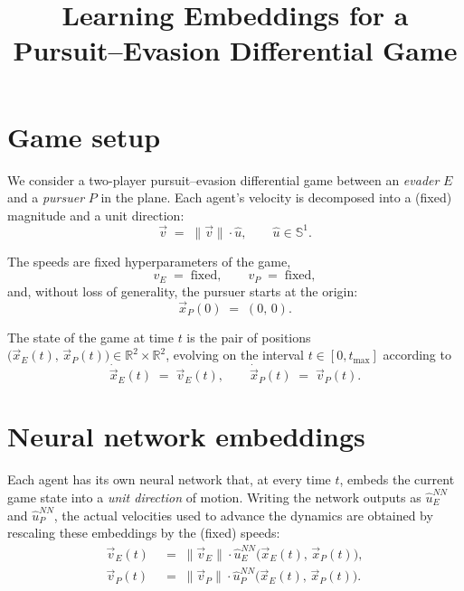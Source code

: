 \documentclass[11pt]{article}
\title{Learning Embeddings for a Pursuit--Evasion Differential Game}
\author{}
\date{}
\begin{document}
\maketitle

\section{Game setup}

We consider a two-player pursuit--evasion differential game between an
\emph{evader} $E$ and a \emph{pursuer} $P$ in the plane.
Each agent's velocity is decomposed into a (fixed) magnitude and a unit
direction:
\begin{equation}
  \vec{v} \;=\; \|\vec{v}\| \cdot \hat{u},
  \qquad \hat{u} \in \mathbb{S}^{1}.
\end{equation}

The speeds are fixed hyperparameters of the game,
\begin{equation}
  v_E \;=\; \text{fixed}, \qquad v_P \;=\; \text{fixed},
\end{equation}
and, without loss of generality, the pursuer starts at the origin:
\begin{equation}
  \vec{x}_P(0) \;=\; (0,\,0).
\end{equation}

The state of the game at time $t$ is the pair of positions
$\bigl(\vec{x}_E(t),\,\vec{x}_P(t)\bigr) \in \mathbb{R}^2 \times \mathbb{R}^2$,
evolving on the interval $t \in [0, t_{\max}]$ according to
\begin{equation}
  \dot{\vec{x}}_E(t) \;=\; \vec{v}_E(t), \qquad
  \dot{\vec{x}}_P(t) \;=\; \vec{v}_P(t).
\end{equation}

\section{Neural network embeddings}

Each agent has its own neural network that, at every time $t$, embeds the
current game state into a \emph{unit direction} of motion.  Writing the
network outputs as $\hat{u}_E^{NN}$ and $\hat{u}_P^{NN}$, the actual
velocities used to advance the dynamics are obtained by rescaling these
embeddings by the (fixed) speeds:
\begin{align}
  \vec{v}_E(t) &\;=\; \|\vec{v}_E\| \cdot \hat{u}_E^{NN}\!\bigl(\vec{x}_E(t),\,\vec{x}_P(t)\bigr), \\
  \vec{v}_P(t) &\;=\; \|\vec{v}_P\| \cdot \hat{u}_P^{NN}\!\bigl(\vec{x}_E(t),\,\vec{x}_P(t)\bigr).
\end{align}
\end{document}
